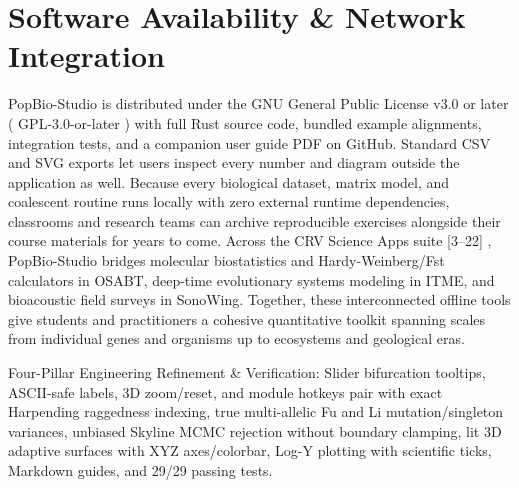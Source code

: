 \documentclass[10pt,letterpaper]{article}
\begin{document}
\section{Software Availability \& Network Integration}
PopBio-Studio is distributed under the GNU General Public License v3.0 or later ( GPL-3.0-or-later ) with full Rust source code, bundled example alignments, integration tests, and a companion user guide PDF on GitHub. Standard CSV and SVG exports let users inspect every number and diagram outside the application as well. Because every biological dataset, matrix model, and coalescent routine runs locally with zero external runtime dependencies, classrooms and research teams can archive reproducible exercises alongside their course materials for years to come. Across the CRV Science Apps suite [3--22] , PopBio-Studio bridges molecular biostatistics and Hardy-Weinberg/Fst calculators in OSABT, deep-time evolutionary systems modeling in ITME, and bioacoustic field surveys in SonoWing. Together, these interconnected offline tools give students and practitioners a cohesive quantitative toolkit spanning scales from individual genes and organisms up to ecosystems and geological eras.

Four-Pillar Engineering Refinement \& Verification: Slider bifurcation tooltips, ASCII-safe labels, 3D zoom/reset, and module hotkeys pair with exact Harpending raggedness indexing, true multi-allelic Fu and Li mutation/singleton variances, unbiased Skyline MCMC rejection without boundary clamping, lit 3D adaptive surfaces with XYZ axes/colorbar, Log-Y plotting with scientific ticks, Markdown guides, and 29/29 passing tests.
\end{document}
